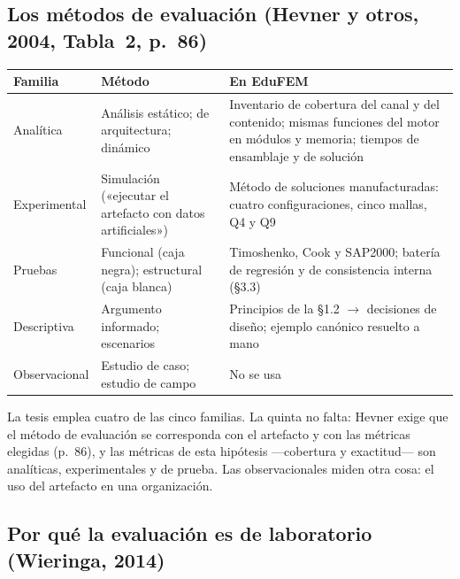 \documentclass[11pt,a4paper]{article}
\begin{document}
\subsection{Los métodos de evaluación (Hevner y otros, 2004, Tabla~2, p.~86)}

{\small
\begin{longtable}{L{2.6cm}L{4.6cm}L{8.5cm}}
\toprule
\textbf{Familia} & \textbf{Método} & \textbf{En EduFEM} \\
\midrule
\endhead
Analítica & Análisis estático; de arquitectura; dinámico & Inventario de cobertura del canal y del contenido; mismas funciones del motor en módulos y memoria; tiempos de ensamblaje y de solución \\
Experimental & Simulación («ejecutar el artefacto con datos artificiales») & Método de soluciones manufacturadas: cuatro configuraciones, cinco mallas, Q4 y Q9 \\
Pruebas & Funcional (caja negra); estructural (caja blanca) & Timoshenko, Cook y SAP2000; batería de regresión y de consistencia interna (§3.3) \\
Descriptiva & Argumento informado; escenarios & Principios de la §1.2 $\to$ decisiones de diseño; ejemplo canónico resuelto a mano \\
Observacional & Estudio de caso; estudio de campo & No se usa \\
\bottomrule
\end{longtable}}

La tesis emplea cuatro de las cinco familias. La quinta no falta: Hevner exige que el método de evaluación se corresponda con el artefacto y con las métricas elegidas (p.~86), y las métricas de esta hipótesis —cobertura y exactitud— son analíticas, experimentales y de prueba. Las observacionales miden otra cosa: el uso del artefacto en una organización.

\subsection{Por qué la evaluación es de laboratorio (Wieringa, 2014)}
\end{document}
